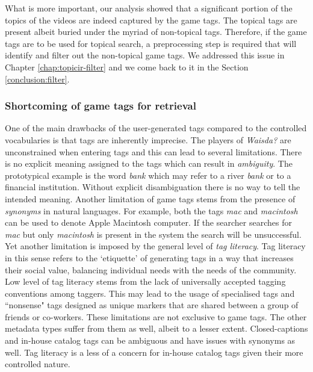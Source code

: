 What is more important, our analysis showed that a significant portion of the topics of the videos are indeed captured by the game tags. The topical tags are present albeit buried under the myriad of non-topical tags. Therefore, if the game tags are to be used for topical search, a preprocessing step is required that will identify and filter out the non-topical game tags. We addressed this issue in Chapter \ref{chap:topicir-filter} and we come back to it in the Section \ref{conclusion:filter}.

\subsubsection{Shortcoming of game tags for retrieval}\label{conclusion:folsonomy-flaw}
One of the main drawbacks of the user-generated tags compared to the controlled vocabularies is that tags are inherently imprecise. %
The players of \textit{Waisda?} are unconstrained when entering tags and this can lead to several limitations. There is no explicit meaning assigned to the tags which can result in \textit{ambiguity}. 
The prototypical example is the word \textit{bank} which may refer to a river \textit{bank} or to a financial institution.
Without explicit disambiguation there is no way to tell the intended meaning. Another limitation of game tags stems from the presence of \textit{synonyms} in natural languages. For example, both the tags \textit{mac} and \textit{macintosh} can be used to denote Apple Macintosh computer. If the searcher searches for \textit{mac} but only \textit{macintosh} is present in the system the search will be unsuccessful.
Yet another limitation is imposed by the general level of \textit{tag literacy}. 
Tag literacy in this sense refers to the `etiquette' of generating tags in a way that increases their social value, balancing individual needs with the needs of the community. Low level of tag literacy stems from the lack of universally accepted tagging conventions among taggers.
This may lead to the usage of specialised tags and ``nonsense" tags designed as unique markers that are shared between a group of friends or co-workers. These limitations are not exclusive to game tags. The other metadata types suffer from them as well, albeit to a lesser extent. Closed-captions and in-house catalog tags can be ambiguous and have issues with synonyms as well. Tag literacy is a less of a concern for in-house catalog tags given their more controlled nature. 

